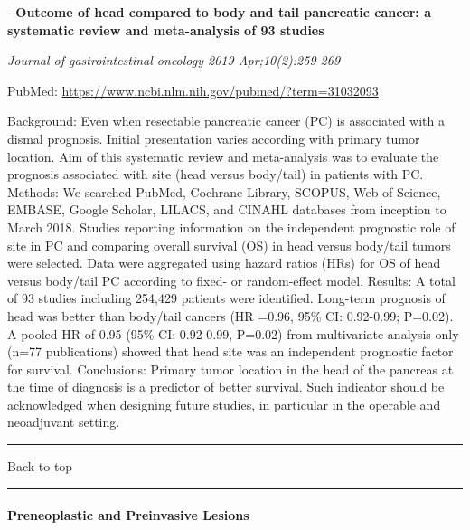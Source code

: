 \documentclass[]{article}
\let\oldparagraph\paragraph
\renewcommand{\paragraph}[1]{\oldparagraph{#1}\mbox{}}
\begin{document}
 - \textbf{Outcome of head compared to body and tail pancreatic cancer:
a systematic review and meta-analysis of 93 studies}

\emph{Journal of gastrointestinal oncology 2019 Apr;10(2):259-269}

PubMed: \url{https://www.ncbi.nlm.nih.gov/pubmed/?term=31032093}

Background: Even when resectable pancreatic cancer (PC) is associated
with a dismal prognosis. Initial presentation varies according with
primary tumor location. Aim of this systematic review and meta-analysis
was to evaluate the prognosis associated with site (head versus
body/tail) in patients with PC. Methods: We searched PubMed, Cochrane
Library, SCOPUS, Web of Science, EMBASE, Google Scholar, LILACS, and
CINAHL databases from inception to March 2018. Studies reporting
information on the independent prognostic role of site in PC and
comparing overall survival (OS) in head versus body/tail tumors were
selected. Data were aggregated using hazard ratios (HRs) for OS of head
versus body/tail PC according to fixed- or random-effect model. Results:
A total of 93 studies including 254,429 patients were identified.
Long-term prognosis of head was better than body/tail cancers (HR =0.96,
95\% CI: 0.92-0.99; P=0.02). A pooled HR of 0.95 (95\% CI: 0.92-0.99,
P=0.02) from multivariate analysis only (n=77 publications) showed that
head site was an independent prognostic factor for survival.
Conclusions: Primary tumor location in the head of the pancreas at the
time of diagnosis is a predictor of better survival. Such indicator
should be acknowledged when designing future studies, in particular in
the operable and neoadjuvant setting.

{}

{}

\begin{center}\rule{0.5\linewidth}{\linethickness}\end{center}

Back to top

\begin{center}\rule{0.5\linewidth}{\linethickness}\end{center}

\pagebreak

\hypertarget{preneoplastic-and-preinvasive-lesions}{%
\paragraph{Preneoplastic and Preinvasive
Lesions}\label{preneoplastic-and-preinvasive-lesions}}
\end{document}
